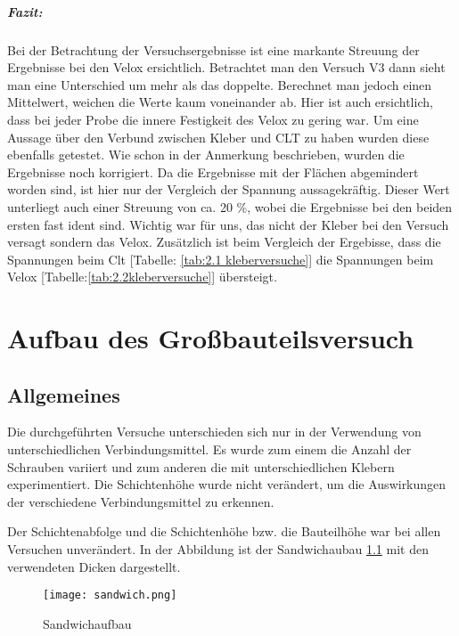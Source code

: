 \documentclass[12 pt,a4 paper ]{scrreprt}
\begin{document}
\newpage{}

\paragraph{Fazit:}

Bei der Betrachtung der Versuchsergebnisse ist eine markante Streuung der Ergebnisse bei den Velox ersichtlich. Betrachtet man den Versuch V3 dann sieht man eine Unterschied um mehr als das doppelte. Berechnet man jedoch einen Mittelwert, weichen die Werte kaum voneinander ab. Hier ist auch ersichtlich, dass bei jeder Probe die innere Festigkeit des Velox zu gering war. 
Um eine Aussage über den Verbund zwischen Kleber und CLT zu haben wurden diese ebenfalls getestet. Wie schon in der Anmerkung beschrieben, wurden die Ergebnisse noch korrigiert. Da die Ergebnisse mit der Flächen abgemindert worden sind, ist hier nur der Vergleich der Spannung aussagekräftig. Dieser Wert unterliegt auch einer Streuung von ca. 20 \%, wobei die Ergebnisse bei den beiden ersten fast ident sind. 
Wichtig war für uns, das nicht der Kleber bei den Versuch versagt sondern das Velox. Zusätzlich ist beim Vergleich der Ergebisse, dass die Spannungen beim Clt [Tabelle: \ref{tab:2.1 kleberversuche}] die Spannungen beim Velox [Tabelle:\ref{tab:2.2kleberversuche}] übersteigt.

\chapter{Aufbau des Großbauteilsversuch}

\section{Allgemeines}

Die durchgeführten Versuche unterschieden sich nur in der Verwendung von unterschiedlichen Verbindungsmittel. Es wurde zum einem die Anzahl der Schrauben variiert und zum anderen die mit unterschiedlichen Klebern experimentiert. Die Schichtenhöhe wurde nicht verändert, um die Auswirkungen der verschiedene Verbindungsmittel zu erkennen.

Der Schichtenabfolge und die Schichtenhöhe bzw. die Bauteilhöhe war bei allen Versuchen unverändert. In der Abbildung ist der Sandwichaubau \ref{sandwichaufbau} mit den verwendeten Dicken dargestellt.

\begin{figure}[h]
\begin{center}
\texttt{[image: sandwich.png]}
\caption{Sandwichaufbau}
\label{sandwichaufbau}
\end{center}
\end{figure}
\end{document}
